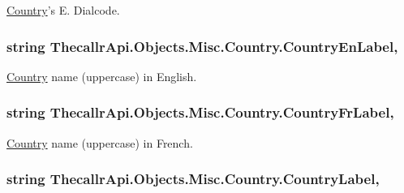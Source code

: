 \hyperlink{class_thecallr_api_1_1_objects_1_1_misc_1_1_country}{Country}'s E. Dialcode. 

\hypertarget{class_thecallr_api_1_1_objects_1_1_misc_1_1_country_a7cdc50ff26233fdb7d3bf0d1c5f217bf}{
\subsubsection[{Country\+En\+Label}]{\setlength{\rightskip}{0pt plus 5cm}string Thecallr\+Api.\+Objects.\+Misc.\+Country.\+Country\+En\+Label\hspace{0.3cm}{\ttfamily [get]}, {\ttfamily [set]}}}\label{class_thecallr_api_1_1_objects_1_1_misc_1_1_country_a7cdc50ff26233fdb7d3bf0d1c5f217bf}


\hyperlink{class_thecallr_api_1_1_objects_1_1_misc_1_1_country}{Country} name (uppercase) in English. 

\hypertarget{class_thecallr_api_1_1_objects_1_1_misc_1_1_country_a720ea690f46e37e46d7174eb634778da}{
\subsubsection[{Country\+Fr\+Label}]{\setlength{\rightskip}{0pt plus 5cm}string Thecallr\+Api.\+Objects.\+Misc.\+Country.\+Country\+Fr\+Label\hspace{0.3cm}{\ttfamily [get]}, {\ttfamily [set]}}}\label{class_thecallr_api_1_1_objects_1_1_misc_1_1_country_a720ea690f46e37e46d7174eb634778da}


\hyperlink{class_thecallr_api_1_1_objects_1_1_misc_1_1_country}{Country} name (uppercase) in French. 

\hypertarget{class_thecallr_api_1_1_objects_1_1_misc_1_1_country_a243dc036f1c7e06c7e5cf5cc8aa81011}{
\subsubsection[{Country\+Label}]{\setlength{\rightskip}{0pt plus 5cm}string Thecallr\+Api.\+Objects.\+Misc.\+Country.\+Country\+Label\hspace{0.3cm}{\ttfamily [get]}, {\ttfamily [set]}}}\label{class_thecallr_api_1_1_objects_1_1_misc_1_1_country_a243dc036f1c7e06c7e5cf5cc8aa81011}


